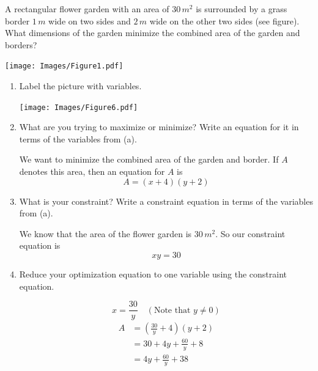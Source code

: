 \documentclass[nooutcomes]{ximera}
\begin{document}
\begin{problem}

  A rectangular flower garden with an area of $30 \, m^2$ is surrounded by a grass border $1 \, m$ wide on two sides and $2 \, m$ wide on the other two sides (see figure).
  What dimensions of the garden minimize the combined area of the garden and borders?
  
  \begin{image}
    \texttt{[image: Images/Figure1.pdf]}
  \end{image}

  \begin{enumerate}
    \item  Label the picture with variables.
      \begin{freeResponse}
        \begin{image}
          \texttt{[image: Images/Figure6.pdf]}
	\end{image}
      \end{freeResponse}

    \item  What are you trying to maximize or minimize?
      Write an equation for it in terms of the variables from (a).
      \begin{freeResponse}
        We want to minimize the combined area of the garden and border.  If $A$ denotes this area, then an equation for $A$ is
        $$ A = (x+4)(y+2) $$
      \end{freeResponse}

    \item  What is your constraint?
      Write a constraint equation in terms of the variables from (a).
      \begin{freeResponse}
        We know that the area of the flower garden is $30 \, m^2$.  So our constraint equation is
        $$ xy = 30 $$
      \end{freeResponse}
      
    \item  Reduce your optimization equation to one variable using the constraint equation.

      \begin{freeResponse}
        $$ x = \frac{30}{y} \quad (\text{Note that } y \neq 0) $$
        \begin{align}
          A &= \left( \frac{30}{y} + 4 \right)(y+2) \\
            &= 30 + 4y + \frac{60}{y} + 8 \\
            &=4y + \frac{60}{y} + 38 \label{eqn3}
        \end{align}
      \end{freeResponse}
		

\end{enumerate}
\end{problem}
\end{document}
